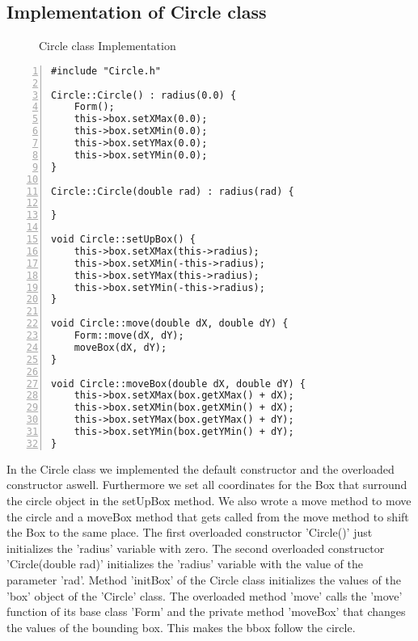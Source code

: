 \documentclass{article}
\begin{document}
\subsection{Implementation of Circle class}
\begin{figure}
\scriptsize{\caption{Circle class Implementation}}
\end{figure}
\begin{lstlisting}[basicstyle=\footnotesize\ttfamily, numbers=left, stepnumber=1, numberstyle = \normalsize]
#include "Circle.h"

Circle::Circle() : radius(0.0) {
	Form();
	this->box.setXMax(0.0);
	this->box.setXMin(0.0);
	this->box.setYMax(0.0);
	this->box.setYMin(0.0);
}

Circle::Circle(double rad) : radius(rad) {

}

void Circle::setUpBox() {
	this->box.setXMax(this->radius);
	this->box.setXMin(-this->radius);
	this->box.setYMax(this->radius);
	this->box.setYMin(-this->radius);
}

void Circle::move(double dX, double dY) {
	Form::move(dX, dY);
	moveBox(dX, dY);
}

void Circle::moveBox(double dX, double dY) {
	this->box.setXMax(box.getXMax() + dX);
	this->box.setXMin(box.getXMin() + dX);
	this->box.setYMax(box.getYMax() + dY);
	this->box.setYMin(box.getYMin() + dY);
}

\end{lstlisting}
\normalsize{In the Circle class we implemented the default constructor and the overloaded constructor aswell. Furthermore we set all coordinates for the Box that surround the circle object in the setUpBox method. We also wrote a move method to move the circle and a moveBox method that gets called from the move method to shift the Box to the same place.\newline
\newline
The first overloaded constructor 'Circle()' just initializes the 'radius' variable with zero. 
The second overloaded constructor 'Circle(double rad)' initializes the 'radius' variable with the value of the parameter 'rad'. 
Method 'initBox' of the Circle class initializes the values of the 'box' object of the 'Circle' class. 
The overloaded method 'move' calls the 'move' function of its base class 'Form' and the private method 'moveBox' that changes the values of the bounding box. This makes the bbox follow the circle.
}
\newpage
\end{document}
